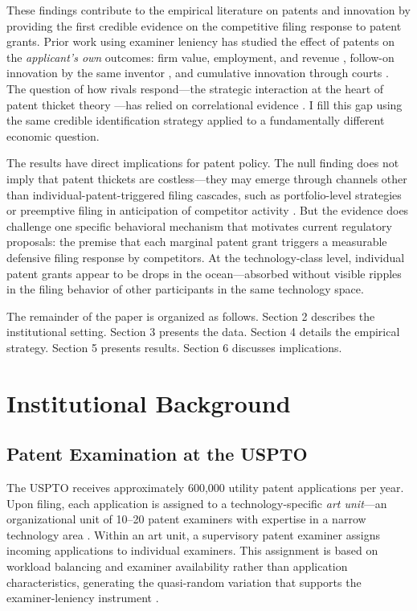 \documentclass[12pt]{article}
\begin{document}
These findings contribute to the empirical literature on patents and innovation by providing the first credible evidence on the competitive filing response to patent grants. Prior work using examiner leniency has studied the effect of patents on the \emph{applicant's own} outcomes: firm value, employment, and revenue \citep{farre2020}, follow-on innovation by the same inventor \citep{sampat2019}, and cumulative innovation through courts \citep{galasso2015}. The question of how rivals respond---the strategic interaction at the heart of patent thicket theory \citep{shapiro2001, vongraevenitz2011}---has relied on correlational evidence \citep{ziedonis2004, noel2013}. I fill this gap using the same credible identification strategy applied to a fundamentally different economic question.

The results have direct implications for patent policy. The null finding does not imply that patent thickets are costless---they may emerge through channels other than individual-patent-triggered filing cascades, such as portfolio-level strategies or preemptive filing in anticipation of competitor activity \citep{cohen2000}. But the evidence does challenge one specific behavioral mechanism that motivates current regulatory proposals: the premise that each marginal patent grant triggers a measurable defensive filing response by competitors. At the technology-class level, individual patent grants appear to be drops in the ocean---absorbed without visible ripples in the filing behavior of other participants in the same technology space.

The remainder of the paper is organized as follows. Section 2 describes the institutional setting. Section 3 presents the data. Section 4 details the empirical strategy. Section 5 presents results. Section 6 discusses implications.


\section{Institutional Background}

\subsection{Patent Examination at the USPTO}

The USPTO receives approximately 600,000 utility patent applications per year. Upon filing, each application is assigned to a technology-specific \emph{art unit}---an organizational unit of 10--20 patent examiners with expertise in a narrow technology area \citep{frakes2017}. Within an art unit, a supervisory patent examiner assigns incoming applications to individual examiners. This assignment is based on workload balancing and examiner availability rather than application characteristics, generating the quasi-random variation that supports the examiner-leniency instrument \citep{farre2020, righi2023}.
\end{document}
